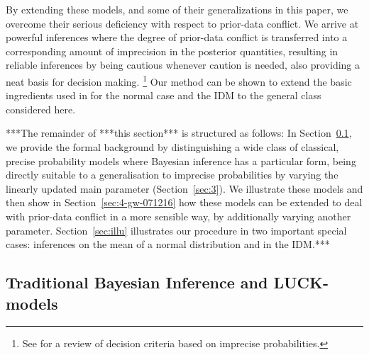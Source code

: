 By extending these models, and some of their generalizations in this
paper, we overcome their serious deficiency with respect to
prior-data conflict. We arrive at powerful inferences where the
degree of prior-data conflict is transferred into a corresponding
amount of imprecision in the posterior quantities, resulting in
reliable inferences by being cautious whenever caution is needed,
also providing a neat basis for decision making.%
\footnote{See \textcite{2007:troffaes} for a review of decision criteria based
on imprecise probabilities.}
Our method can be shown to extend the
basic ingredients used in \textcite{1991:walley} for the normal case and the
IDM to the general class considered here.

\medskip

***The remainder of ***this section*** is structured as follows:
In Section~\ref{070517-sec2-1}, we provide the formal background
by distinguishing a wide class of classical, precise probability models
where Bayesian inference has a particular form, being directly
suitable to a generalisation to imprecise probabilities by varying
the linearly updated main parameter (Section~\ref{sec:3}).
We illustrate these models and then show in Section~\ref{sec:4-gw-071216}
how these models can be extended to deal with prior-data conflict in a more sensible way,
by additionally varying another parameter.
Section~\ref{sec:illu} illustrates our procedure in two important special cases:
inferences on the mean of a normal distribution and in the IDM.***


\subsection{Traditional Bayesian Inference and LUCK-models}
\label{070517-sec2-1}

